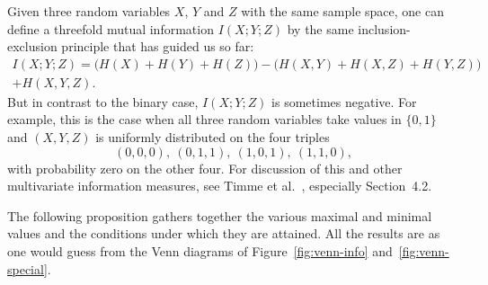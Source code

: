 \begin{remark}
Given three random variables $X$, $Y$ and $Z$ with the same sample
space, one can define a threefold%
% 
% 
mutual information $I(X; Y; Z)$ by the same inclusion-exclusion principle
that has guided us so far:
\begin{multline*}
I(X; Y; Z) 
=
\bigl( H(X) + H(Y) + H(Z) \bigr) 
-
\bigl( H(X, Y) + H(X, Z) + H(Y, Z) \bigr)
\\+
H(X, Y, Z).
\end{multline*}
But in contrast to the binary case, $I(X; Y; Z)$ is sometimes
negative.  For example, this is the case when all three random variables
take values in $\{0, 1\}$ and $(X, Y, Z)$ is uniformly distributed on the
four triples
\[
(0, 0, 0), \ (0, 1, 1), \ (1, 0, 1), \ (1, 1, 0),
\]
with probability zero on the other four.  For discussion of this and other
multivariate information measures, see Timme et al.~\cite{TAFB}, especially
Section~4.2.
\end{remark}

The following proposition gathers together the various maximal and minimal
values and the conditions under which they are attained.  All the results
are as one would guess from the Venn diagrams of Figure~\ref{fig:venn-info}
and~\ref{fig:venn-special}. 

